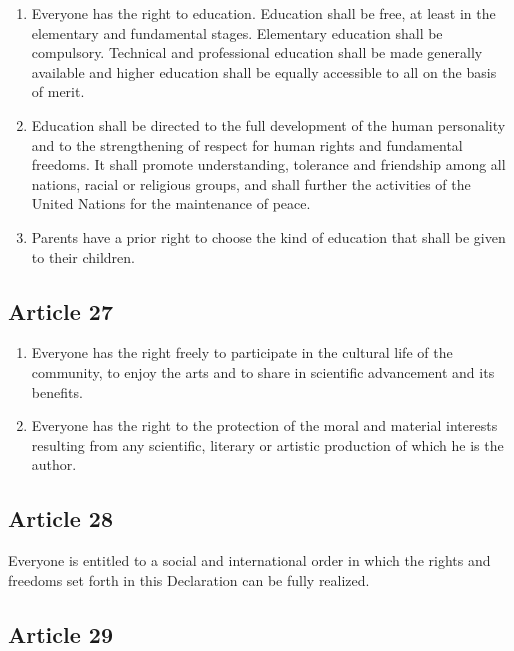 \documentclass[
  ngerman,
  american,
  titlepage,
  openright,
  DIV=calc,
  toc=listof,
  listof=nochaptergap]{scrbook}
\begin{document}
\begin{enumerate}
\def\labelenumi{\arabic{enumi}.}
\item
  Everyone has the right to education. Education shall be free, at least
  in the elementary and fundamental stages. Elementary education shall
  be compulsory. Technical and professional education shall be made
  generally available and higher education shall be equally accessible
  to all on the basis of merit.
\item
  Education shall be directed to the full development of the human
  personality and to the strengthening of respect for human rights and
  fundamental freedoms. It shall promote understanding, tolerance and
  friendship among all nations, racial or religious groups, and shall
  further the activities of the United Nations for the maintenance of
  peace.
\item
  Parents have a prior right to choose the kind of education that shall
  be given to their children.
\end{enumerate}

\subsection{Article 27}\label{article-27-4}

\begin{enumerate}
\def\labelenumi{\arabic{enumi}.}
\item
  Everyone has the right freely to participate in the cultural life of
  the community, to enjoy the arts and to share in scientific
  advancement and its benefits.
\item
  Everyone has the right to the protection of the moral and material
  interests resulting from any scientific, literary or artistic
  production of which he is the author.
\end{enumerate}

\subsection{Article 28}\label{article-28-4}

Everyone is entitled to a social and international order in which the
rights and freedoms set forth in this Declaration can be fully realized.

\subsection{Article 29}\label{article-29-4}
\end{document}
